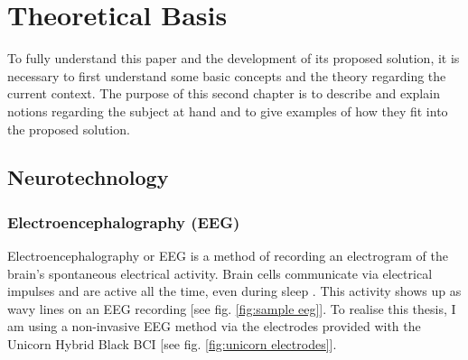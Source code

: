 
\chapter{Theoretical Basis}\label{cap:theory}
To fully understand this paper and the development of its proposed solution, it is necessary to first understand some basic concepts and the theory regarding the current context. The purpose of this second chapter is to describe and explain notions regarding the subject at hand and to give examples of how they fit into the proposed solution.


\section{Neurotechnology}
\subsection{Electroencephalography (EEG)}
Electroencephalography or EEG is a method of recording an electrogram of the brain's spontaneous electrical activity. Brain cells communicate via electrical impulses and are active all the time, even during sleep \cite{EEG_mayoclinic}. This activity shows up as wavy lines on an EEG recording [see fig. \ref{fig:sample eeg}]. To realise this thesis, I am using a non-invasive EEG method via the electrodes provided with the Unicorn Hybrid Black BCI [see fig. \ref{fig:unicorn electrodes}].

